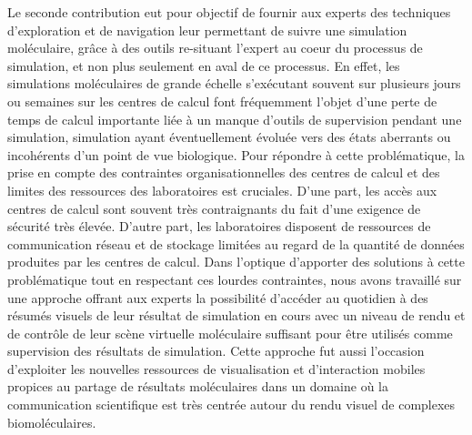 Le seconde contribution eut pour objectif de fournir aux experts des techniques d'exploration et de navigation leur permettant de suivre une simulation moléculaire, grâce à des outils re-situant l'expert au coeur du processus de simulation, et non plus seulement en aval de ce processus. En effet, les simulations moléculaires de grande échelle s’exécutant souvent sur plusieurs jours ou semaines sur les centres de calcul font fréquemment l'objet d'une perte de temps de calcul importante liée à un manque d'outils de supervision pendant une simulation, simulation ayant éventuellement évoluée vers des états aberrants ou incohérents d'un point de vue biologique. Pour répondre à cette problématique, la prise en compte des contraintes organisationnelles des centres de calcul et des limites des ressources des laboratoires est cruciales. D'une part, les accès aux centres de calcul sont souvent très contraignants du fait d'une exigence de sécurité très élevée. D'autre part, les laboratoires disposent de ressources de communication réseau et de stockage limitées au regard de la quantité de données produites par les centres de calcul. Dans l'optique d'apporter des solutions à cette problématique tout en respectant ces lourdes contraintes, nous avons travaillé sur une approche offrant aux experts la possibilité d'accéder au quotidien à des résumés visuels de leur résultat de simulation en cours avec un niveau de rendu et de contrôle de leur scène virtuelle moléculaire suffisant pour être utilisés comme supervision des résultats de simulation. Cette approche fut aussi l'occasion d'exploiter les nouvelles ressources de visualisation et d'interaction mobiles propices au partage de résultats moléculaires dans un domaine où la communication scientifique est très centrée autour du rendu visuel de complexes biomoléculaires.





